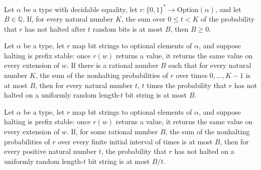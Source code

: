 \begin{theorem}
\label{Randomized.ExpTimeLe.nonneg}
\leanok
{}
Let $\alpha$ be a type with decidable equality, let
$r\colon\{0,1\}^*\to\mathrm{Option}(\alpha)$, and let $B\in\mathbb{Q}$. If, for every
natural number $K$, the sum over $0\le t<K$ of the probability that $r$ has not halted
after $t$ random bits is at most $B$, then $B\ge 0$.
\end{theorem}

\begin{theorem}
\label{Randomized.mul_notHaltedProb_le}
\leanok
{}
Let $\alpha$ be a type, let $r$ map bit strings to optional elements of $\alpha$, and suppose
halting is prefix stable: once $r(w)$ returns a value, it returns the same value on
every extension of $w$. If there is a rational number $B$ such that for every natural
number $K$, the sum of the nonhalting probabilities of $r$ over times $0,\ldots,K-1$ is at
most $B$, then for every natural number $t$, $t$ times the probability that $r$ has not
halted on a uniformly random length-$t$ bit string is at most $B$.
\end{theorem}

\begin{theorem}
\label{Randomized.notHaltedProb_le_div}
\leanok
{}
Let $\alpha$ be a type, let $r$ map bit strings to optional elements of $\alpha$, and suppose
halting is prefix stable: once $r(w)$ returns a value, it returns the same value on
every extension of $w$. If, for some rational number $B$, the sum of the nonhalting
probabilities of $r$ over every finite initial interval of times is at most $B$, then
for every positive natural number $t$, the probability that $r$ has not halted on a
uniformly random length-$t$ bit string is at most $B/t$.
\end{theorem}

